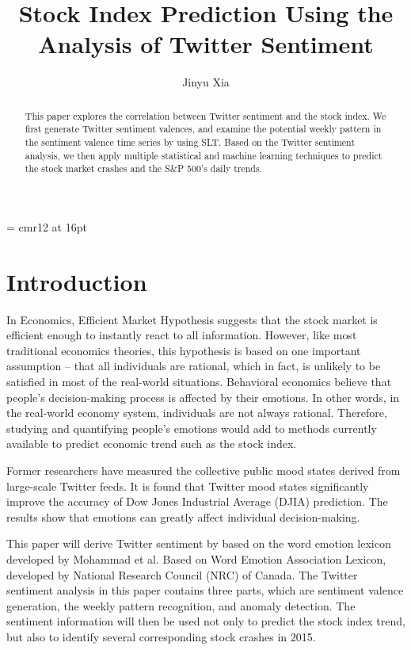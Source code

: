 \documentclass[10pt,letterpaper]{article}
\begin{document}
\font\myfont= cmr12 at 16pt
\title{\myfont Stock Index Prediction Using the Analysis of Twitter Sentiment}
\author{Jinyu Xia}
\maketitle

\begin{abstract}
This paper explores the correlation between Twitter sentiment and the stock index. We first generate Twitter sentiment valences, and examine the potential weekly pattern in the sentiment valence time series by using SLT. Based on the Twitter sentiment analysis, we then apply multiple statistical and machine learning techniques to predict the stock market crashes and the S\&P 500's daily trends.  
\end{abstract}




\section{Introduction} 
In Economics, Efficient Market Hypothesis suggests that the stock market is efficient enough to instantly react to all information. However, like most traditional economics theories, this hypothesis is based on one important assumption -- that all individuals are rational, which in fact, is unlikely to be satisfied in most of the real-world situations. Behavioral economics believe that people's decision-making process is affected by their emotions. In other words, in the real-world economy system, individuals are not always rational. Therefore, studying and quantifying people's emotions would add to methods currently available to predict economic trend such as the stock index.

Former researchers have measured the collective public mood states derived from large-scale Twitter feeds\cite{bollen2011twitter}. It is found that Twitter mood states significantly improve the accuracy of Dow Jones Industrial Average (DJIA) prediction. The results show that emotions can greatly affect individual decision-making. 

This paper will derive Twitter sentiment by based on the word emotion lexicon developed by Mohammad et al\cite{mohammad2010emotions}. Based on Word Emotion Association Lexicon, developed by National Research Council (NRC) of Canada. The Twitter sentiment analysis in this paper contains three parts, which are sentiment valence generation, the weekly pattern recognition, and anomaly detection. The sentiment information will then be used not only to predict the stock index trend, but also to identify several corresponding stock crashes in 2015. 
\end{document}
